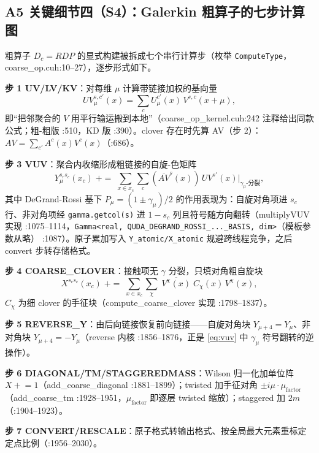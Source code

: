 \documentclass[UTF8]{ctexart}
\begin{document}
\subsection{A5 关键细节四（S4）：Galerkin 粗算子的七步计算图}

粗算子 $D_c=RDP$ 的显式构建被拆成七个串行计算步（枚举 \texttt{ComputeType}，coarse\_op.cuh:10--27），逐步形式如下。

\textbf{步 1 UV/LV/KV}：对每维 $\mu$ 计算带链接加权的基向量
\begin{equation}
UV_\mu^{s,c'}(x)=\sum_c U_\mu^{c'}(x)\,V^{s,c}(x+\mu),
\label{eq:uv}
\end{equation}
即``把邻聚合的 $V$ 用平行输运搬到本地''（coarse\_op\_kernel.cuh:242 注释给出同款公式；粗-粗版 :510，KD 版 :390）。clover 存在时先算 AV（步 2）：$AV=\sum_{c'}A^{c}(x)V^{c}(x)$（:686）。

\textbf{步 3 VUV}：聚合内收缩形成粗链接的自旋-色矩阵
\begin{equation}
Y_\mu^{s_rs_c}(x_c)\;{+}{=}\;\sum_{x\in x_c}\sum_{c}(\overline{AV}^{s}(x))\,UV^{s'}(x)\Big|_{\gamma_\mu\text{-分裂}},
\label{eq:vuv}
\end{equation}
其中 DeGrand-Rossi 基下 $P_\mu=(1\pm\gamma_\mu)/2$ 的作用表现为：自旋对角项进 $s_c$ 行、非对角项经 \texttt{gamma.getcol(s)} 进 $1-s_c$ 列且符号随方向翻转（multiplyVUV 实现 :1075--1114，\texttt{Gamma<real, QUDA\_DEGRAND\_ROSSI\_...\_BASIS, dim>}（模板参数从略） :1087）。原子累加写入 \texttt{Y\_atomic/X\_atomic} 规避跨线程竞争，之后 convert 步转存储格式。

\textbf{步 4 COARSE\_CLOVER}：接触项无 $\gamma$ 分裂，只填对角粗自旋块
\begin{equation}
X^{s_cs_c}(x_c)\;{+}{=}\;\sum_{x\in x_c}\sum_{\chi}\;\overline{V^{\chi}(x)}\;C_\chi(x)\,V^{\chi}(x),
\label{eq:xdiag}
\end{equation}
$C_\chi$ 为细 clover 的手征块（compute\_coarse\_clover 实现 :1798--1837）。

\textbf{步 5 REVERSE\_Y}：由后向链接恢复前向链接——自旋对角块 $Y_{\mu+4}=Y_\mu$、非对角块 $Y_{\mu+4}=-Y_\mu$（reverse 内核 :1856--1876，正是 \eqref{eq:vuv} 中 $\gamma_\mu$ 符号翻转的逆操作）。

\textbf{步 6 DIAGONAL/TM/STAGGEREDMASS}：Wilson 归一化加单位阵 $X\mathrel{+}=1$（add\_coarse\_diagonal :1881--1899）；twisted 加手征对角 $\pm i\mu\cdot\mu_{\text{factor}}$（add\_coarse\_tm :1928--1951，$\mu_{\text{factor}}$ 即逐层 twisted 缩放）；staggered 加 $2m$（:1904--1923）。

\textbf{步 7 CONVERT/RESCALE}：原子格式转输出格式、按全局最大元素重标定定点比例（:1956--2030）。
\end{document}
